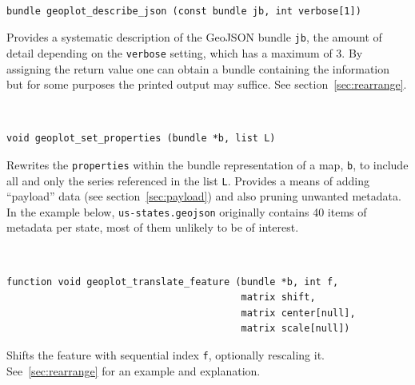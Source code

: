 \documentclass{article}
\newenvironment{funcdoc}
{\noindent\hrulefill\\[-10pt]}
{\medskip}
\begin{document}
\begin{funcdoc}
\begin{verbatim}
bundle geoplot_describe_json (const bundle jb, int verbose[1])
\end{verbatim}
  Provides a systematic description of the GeoJSON bundle \texttt{jb},
  the amount of detail depending on the \texttt{verbose} setting,
  which has a maximum of 3. By assigning the return value one can
  obtain a bundle containing the information but for some purposes the
  printed output may suffice. See section~\ref{sec:rearrange}.
\end{funcdoc}

\begin{funcdoc}
\begin{verbatim}
void geoplot_set_properties (bundle *b, list L)
\end{verbatim}
  Rewrites the \texttt{properties} within the bundle representation of
  a map, \texttt{b}, to include all and only the series referenced in
  the list \texttt{L}. Provides a means of adding ``payload'' data
  (see section~\ref{sec:payload}) and also pruning unwanted metadata.
  In the example below, \texttt{us-states.geojson} originally contains
  40 items of metadata per state, most of them unlikely to be of
  interest.
\end{funcdoc}

\begin{funcdoc}
\begin{verbatim}
function void geoplot_translate_feature (bundle *b, int f,
                                         matrix shift,
                                         matrix center[null],
                                         matrix scale[null])
\end{verbatim}
  Shifts the feature with sequential index \texttt{f}, optionally
  rescaling it. See~\ref{sec:rearrange} for an example and
  explanation.
\end{funcdoc}
\end{document}
